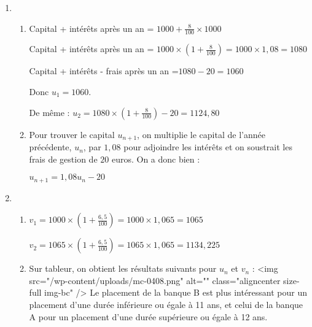 \begin{corrige}
     \begin{enumerate}
          \item
          \begin{enumerate}[label=\alph*.]
               \item
               Capital + intérêts après un an  = $1000 + \frac{8}{100}\times 1000$
               \par
               Capital + intérêts après un an  = $1000\times \left(1+\frac{8}{100}\right)=1000\times 1,08=1080$
               \par
               Capital + intérêts - frais après un an =$1080-20 = 1060$
               \par
               Donc $u_{1}=1060$.
               \par
               De même : $u_{2}=1080\times \left(1+\frac{8}{100}\right)-20 = 1124,80$
               \item
               Pour trouver le capital $u_{n+1}$, on multiplie le capital de l'année précédente, $u_{n}$, par $1,08$ pour adjoindre les intérêts et on soustrait les frais de gestion de $20$ euros. On a donc bien :
               \par
               $u_{n+1}=1,08u_{n}-20$
          \end{enumerate}
          \item
          \begin{enumerate}[label=\alph*.]
               \item
               $v_{1}=1000\times \left(1+\frac{6,5}{100}\right)=1000\times 1,065=1065$
               \par
               $v_{2}=1065\times \left(1+\frac{6,5}{100}\right)=1065\times 1,065=1134,225$
               \item
               Sur tableur, on obtient les résultats suivants pour $u_{n}$ et $v_{n}$ :
               <img src="/wp-content/uploads/mc-0408.png" alt="" class="aligncenter size-full  img-bc" />
               Le placement de la banque B est plus intéressant pour un placement d'une durée inférieure ou égale à 11 ans, et celui de la banque A pour un placement d'une durée supérieure ou égale à 12 ans.
          \end{enumerate}
     \end{enumerate}
\end{corrige}
